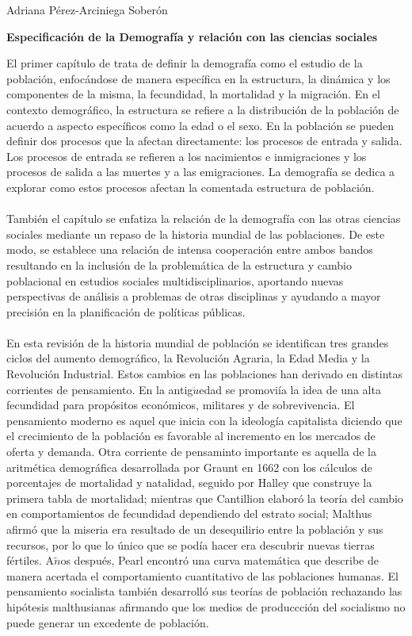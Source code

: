 \documentclass[11pt,spanish,letterpaper]{article}
\theoremstyle{plain}
\begin{document}
\begin{flushleft}
Adriana P\'erez-Arciniega Sober\'on
\end{flushleft}
\begin{center}
\textbf{Especificaci\'on de la Demograf\'ia y relaci\'on con las ciencias sociales}
\end{center} 
El primer cap\'itulo de \cite{welti1997demografia} trata de definir la demograf\'ia como el estudio de la poblaci\'on, enfoc\'andose de manera espec\'ifica en la estructura, la din\'amica y los componentes de la misma, la fecundidad, la mortalidad y la migraci\'on. En el contexto demogr\'afico, la estructura se refiere a la distribuci\'on de la poblaci\'on de acuerdo a aspecto espec\'ificos como la edad o el sexo. En la poblaci\'on se pueden definir dos procesos que la afectan directamente: los procesos de entrada y salida. Los procesos de entrada se refieren a los nacimientos e inmigraciones y los procesos de salida a las muertes y a las emigraciones. La demograf\'ia se dedica a explorar como estos procesos afectan la comentada estructura de poblaci\'on.\\
\\
Tambi\'en el cap\'itulo se enfatiza la relaci\'on de la demograf\'ia con las otras ciencias sociales mediante un repaso de la historia mundial de las poblaciones. De este modo, se establece una relaci\'on de intensa cooperaci\'on entre ambos bandos resultando en la inclusi\'on de la problem\'atica de la estructura y cambio poblacional en estudios sociales multidisciplinarios, aportando nuevas perspectivas de an\'alisis a problemas de otras disciplinas y ayudando a mayor precisi\'on en la planificaci\'on de pol\'iticas p\'ublicas.\\
\\
En esta revisi\'on de la historia mundial de poblaci\'on se identifican tres grandes ciclos del aumento demogr\'afico, la Revoluci\'on Agraria, la Edad Media y la Revoluci\'on Industrial. Estos cambios en las poblaciones han derivado en distintas corrientes de pensamiento. En la antig$\ddot{u}$edad se promovi\'ia la idea de una alta fecundidad para prop\'ositos econ\'omicos, militares y de sobrevivencia. El pensamiento moderno es aquel que inicia con la ideolog\'ia capitalista diciendo que el crecimiento de la poblaci\'on es favorable al incremento en los mercados de oferta y demanda. Otra corriente de pensaminto importante es aquella de la aritm\'etica demogr\'afica desarrollada por Graunt en 1662 con los c\'alculos de porcentajes de mortalidad y natalidad, seguido por Halley que construye la primera tabla de mortalidad; mientras que Cantillion elabor\'o la teor\'ia del cambio en comportamientos de fecundidad dependiendo del estrato social; Malthus afirm\'o que la miseria era resultado de un desequilirio entre la poblaci\'on y sus recursos, por lo que lo \'unico que se pod\'ia hacer era descubrir nuevas tierras f\'ertiles. A$\tilde{n}$os despu\'es, Pearl encontr\'o una curva matem\'atica que describe de manera acertada el comportamiento cuantitativo de las poblaciones humanas. El pensamiento socialista tambi\'en desarroll\'o sus teor\'ias de poblaci\'on rechazando las hip\'otesis malthusianas afirmando que los medios de produccci\'on del socialismo no puede generar un excedente de poblaci\'on.\\
\end{document}
